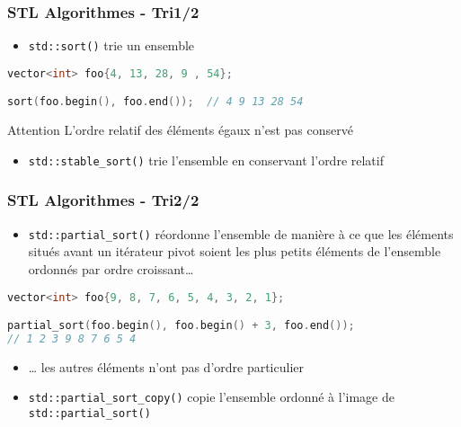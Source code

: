 \documentclass[C++.tex]{subfiles}
\begin{document}
\begin{frame}[fragile]
	\frametitle{STL Algorithmes - Tri\titlehfill{}1/2}


	\begin{itemize}
		\item \lstinline|std::sort()| trie un ensemble
	\end{itemize}

	\begin{lstlisting}[language=C++]
vector<int> foo{4, 13, 28, 9 , 54};

sort(foo.begin(), foo.end());  // 4 9 13 28 54\end{lstlisting}

	\begin{alertblock}{Attention}
		L'ordre relatif des éléments égaux n'est pas conservé

	\end{alertblock}

	\begin{itemize}
		\item \lstinline|std::stable_sort()| trie l'ensemble en conservant l'ordre relatif
	\end{itemize}
\end{frame}

\begin{frame}[fragile]
	\frametitle{STL Algorithmes - Tri\titlehfill{}2/2}
	\begin{itemize}
		\item \lstinline|std::partial_sort()| réordonne l'ensemble de manière à ce que les éléments situés avant un itérateur pivot soient les plus petits éléments de l'ensemble ordonnés par ordre croissant\ldots
	\end{itemize}

	\begin{lstlisting}[language=C++]
vector<int> foo{9, 8, 7, 6, 5, 4, 3, 2, 1};

partial_sort(foo.begin(), foo.begin() + 3, foo.end());
// 1 2 3 9 8 7 6 5 4\end{lstlisting}

	\begin{itemize}
		\item \ldots{} les autres éléments n'ont pas d'ordre particulier
		\item \lstinline|std::partial_sort_copy()| copie l'ensemble ordonné à l'image de \lstinline|std::partial_sort()|
	\end{itemize}
\end{frame}
\end{document}
